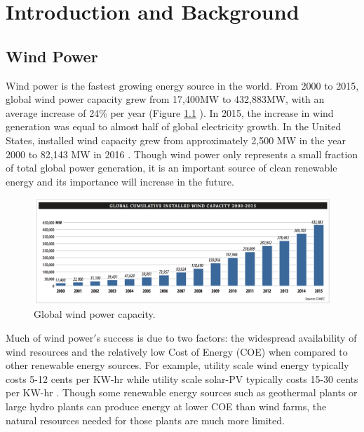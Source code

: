 
\chapter{Introduction and Background} %

\label{Chapter1} %


\section{Wind Power}

Wind power is the fastest growing energy source in the world.  From 2000 to 2015, global wind power capacity grew from 17,400MW to 432,883MW, with an average increase of 24\% per year (Figure \ref{fig1-1} ). In 2015, the increase in wind generation was equal to almost half of global electricity growth\cite{sawyer2015}. In the United States, installed wind capacity grew from approximately 2,500 MW in the year 2000 to 82,143 MW in 2016 \cite{williams2016}. Though wind power only represents a small fraction of total global power generation, it is an important source of clean renewable energy and its importance will increase in the future.

\begin{figure}[htbp]
	\centering
		\includegraphics[width=\linewidth]{Figures/ch1Figures/fig1-1.png}
	\caption{Global wind power capacity. \cite{sawyer2015}}
	\label{fig1-1}
\end{figure}

Much of wind power$'$s success is due to two factors: the widespread availability of wind resources and the relatively low Cost of Energy (COE) when compared to other renewable energy sources.  For example, utility scale wind energy typically costs 5-12 cents per KW-hr while utility scale solar-PV typically costs 15-30 cents per KW-hr \cite{ren212011}. Though some renewable energy sources such as geothermal plants or large hydro plants can produce energy at lower COE than wind farms, the natural resources needed for those plants are much more limited.  

